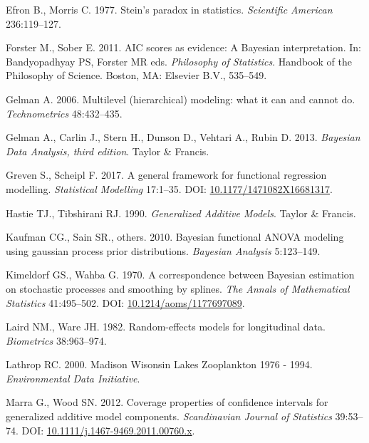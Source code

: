 \documentclass[12pt]{article}
\begin{document}
\hypertarget{ref-efron_steins_1977}{}
Efron B., Morris C. 1977. Stein's paradox in statistics.
\emph{Scientific American} 236:119--127.

\hypertarget{ref-forster_aic_2011}{}
Forster M., Sober E. 2011. AIC scores as evidence: A Bayesian
interpretation. In: Bandyopadhyay PS, Forster MR eds. \emph{Philosophy
of Statistics}. Handbook of the Philosophy of Science. Boston, MA:
Elsevier B.V., 535--549.

\hypertarget{ref-Gelman:2006jh}{}
Gelman A. 2006. Multilevel (hierarchical) modeling: what it can and
cannot do. \emph{Technometrics} 48:432--435.

\hypertarget{ref-gelman2013bayesian}{}
Gelman A., Carlin J., Stern H., Dunson D., Vehtari A., Rubin D. 2013.
\emph{Bayesian Data Analysis, third edition}. Taylor \& Francis.

\hypertarget{ref-greven_general_2017}{}
Greven S., Scheipl F. 2017. A general framework for functional
regression modelling. \emph{Statistical Modelling} 17:1--35. DOI:
\href{https://doi.org/10.1177/1471082X16681317}{10.1177/1471082X16681317}.

\hypertarget{ref-Hastie:1990vg}{}
Hastie TJ., Tibshirani RJ. 1990. \emph{Generalized Additive Models}.
Taylor \& Francis.

\hypertarget{ref-kaufman_bayesian_2010}{}
Kaufman CG., Sain SR., others. 2010. Bayesian functional ANOVA modeling
using gaussian process prior distributions. \emph{Bayesian Analysis}
5:123--149.

\hypertarget{ref-kimeldorf_correspondence_1970}{}
Kimeldorf GS., Wahba G. 1970. A correspondence between Bayesian
estimation on stochastic processes and smoothing by splines. \emph{The
Annals of Mathematical Statistics} 41:495--502. DOI:
\href{https://doi.org/10.1214/aoms/1177697089}{10.1214/aoms/1177697089}.

\hypertarget{ref-laird_random-effects_1982}{}
Laird NM., Ware JH. 1982. Random-effects models for longitudinal data.
\emph{Biometrics} 38:963--974.

\hypertarget{ref-lathrop_madison_2000}{}
Lathrop RC. 2000. Madison Wisonsin Lakes Zooplankton 1976 - 1994.
\emph{Environmental Data Initiative}.

\hypertarget{ref-marra_coverage_2012}{}
Marra G., Wood SN. 2012. Coverage properties of confidence intervals for
generalized additive model components. \emph{Scandinavian Journal of
Statistics} 39:53--74. DOI:
\href{https://doi.org/10.1111/j.1467-9469.2011.00760.x}{10.1111/j.1467-9469.2011.00760.x}.
\end{document}
